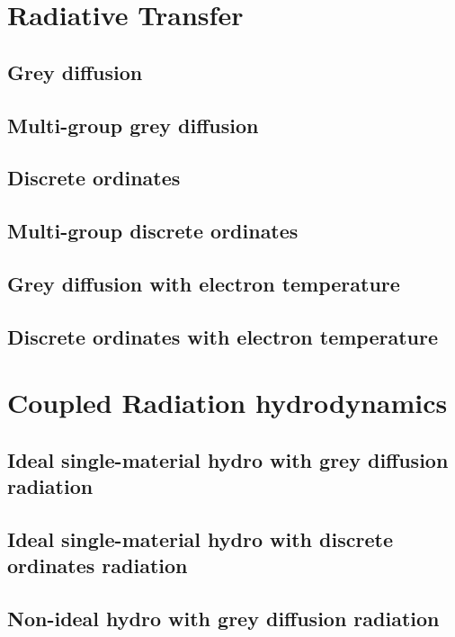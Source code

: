 \documentclass{article}
\begin{document}
\section{Radiative Transfer}
   
   \subsection{Grey diffusion}

   \subsection{Multi-group grey diffusion}

   \subsection{Discrete ordinates}

   \subsection{Multi-group discrete ordinates}

   \subsection{Grey diffusion with electron temperature}

   \subsection{Discrete ordinates with electron temperature}

\section{Coupled Radiation hydrodynamics}

   \subsection{Ideal single-material hydro with grey diffusion radiation}

   \subsection{Ideal single-material hydro with discrete ordinates radiation}

   \subsection{Non-ideal hydro with grey diffusion radiation}
\end{document}
